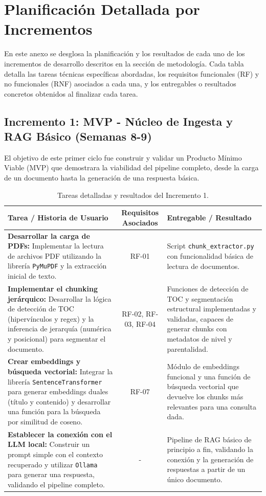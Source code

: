 \chapter{Planificación Detallada por Incrementos}
\label{anexo:planificacion}

En este anexo se desglosa la planificación y los resultados de cada uno de los incrementos de desarrollo descritos en la sección de metodología. Cada tabla detalla las tareas técnicas específicas abordadas, los requisitos funcionales (RF) y no funcionales (RNF) asociados a cada una, y los entregables o resultados concretos obtenidos al finalizar cada tarea.

\newpage
\section*{Incremento 1: MVP - Núcleo de Ingesta y RAG Básico (Semanas 8-9)}
El objetivo de este primer ciclo fue construir y validar un Producto Mínimo Viable (MVP) que demostrara la viabilidad del pipeline completo, desde la carga de un documento hasta la generación de una respuesta básica.

\begin{table}[H]
    \centering
    \renewcommand{\arraystretch}{1.3}
    \caption{Tareas detalladas y resultados del Incremento 1.}
    \label{tab:incremento1_detallado}
    \begin{tabularx}{\textwidth}{|X|c|X|}
    \hline
    \textbf{Tarea / Historia de Usuario} & \textbf{Requisitos Asociados} & \textbf{Entregable / Resultado} \\
    \hline
    \textbf{Desarrollar la carga de PDFs:} Implementar la lectura de archivos PDF utilizando la librería \texttt{PyMuPDF} y la extracción inicial de texto. & RF-01 & Script \texttt{chunk\_extractor.py} con funcionalidad básica de lectura de documentos. \\
    \hline
    \textbf{Implementar el chunking jerárquico:} Desarrollar la lógica de detección de TOC (hipervínculos y regex) y la inferencia de jerarquía (numérica y posicional) para segmentar el documento. & RF-02, RF-03, RF-04 & Funciones de detección de TOC y segmentación estructural implementadas y validadas, capaces de generar chunks con metadatos de nivel y parentalidad. \\
    \hline
    \textbf{Crear embeddings y búsqueda vectorial:} Integrar la librería \texttt{SentenceTransformer} para generar embeddings duales (título y contenido) y desarrollar una función para la búsqueda por similitud de coseno. & RF-07 & Módulo de embeddings funcional y una función de búsqueda vectorial que devuelve los chunks más relevantes para una consulta dada. \\
    \hline
    \textbf{Establecer la conexión con el LLM local:} Construir un prompt simple con el contexto recuperado y utilizar \texttt{Ollama} para generar una respuesta, validando el pipeline completo. & - & Pipeline de RAG básico de principio a fin, validando la conexión y la generación de respuestas a partir de un único documento. \\
    \hline
    \end{tabularx}
\end{table}

